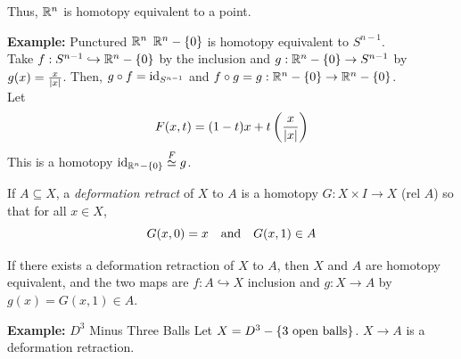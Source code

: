 Thus, $\R^n$ is homotopy equivalent to a point.

\begin{example}{\textbf{Example:} Punctured $\R^n$}
    $\R^n - \{0\}$ is homotopy equivalent to $S^{n - 1}$.\\

    Take $f : S^{n - 1} \hookrightarrow \R^n - \{0\}$ by the inclusion and $g : \R^n - \{0\} \to S^{n - 1}$ by $g(x) = \frac{x}{\abs{x}}$. Then, $g \circ f = \id_{S^{n - 1}}$ and $f \circ g = g : \R^n - \{0\} \to \R^n - \{0\}$.\\

    Let
    \[ F(x, t) = (1 - t)x + t\left(\frac{x}{\abs{x}}\right) \]
    This is a homotopy $\id_{\R^n - \{0\}} \overset{F}{\simeq} g$.
\end{example}

\begin{definition}
    If $A \subseteq X$, a \emph{deformation retract} of $X$ to $A$ is a homotopy $G : X \times I \to X$ (rel $A$) so that for all $x \in X$,
    \[ G(x, 0) = x \quand G(x, 1) \in A \]
\end{definition}

If there exists a deformation retraction of $X$ to $A$, then $X$ and $A$ are homotopy equivalent, and the two maps are $f : A \hookrightarrow X$ inclusion and $g : X \to A$ by $g(x) = G(x, 1) \in A$.

\begin{example}{\textbf{Example:} $D^3$ Minus Three Balls}
    Let $X = D^3 - \{3 \tt{ open balls}\}$.
    $X \to A$ is a deformation retraction.
\end{example}

